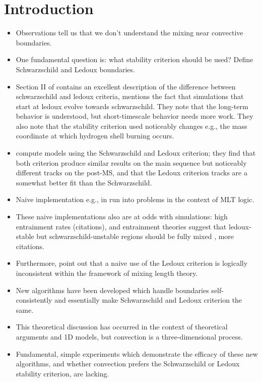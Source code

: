 
\section{Introduction}
\label{sec:introduction}

\begin{itemize}
    \item Observations tell us that we don't understand the mixing near convective boundaries.
    \item One fundamental question is: what stability criterion should be used? Define Schwarzschild and Ledoux boundaries.
    \item Section II of \citet{kaiser_etal_2020} contains an excellent description of the difference between schwarzschild and ledoux criteria, mentions the fact that simulations that start at ledoux evolve towards schwarzschild.
        They note that the long-term behavior is understood, but short-timescale behavior needs more work.
        They also note that the stability criterion used noticeably changes e.g., the mass coordinate at which hydrogen shell burning occurs.
    \item \citet{georgy_etal_2021} compute models using the Schwarzschild and Ledoux criterion; they find that both criterion produce similar results on the main sequence but noticeably different tracks on the post-MS, and that the Ledoux criterion tracks are a somewhat better fit than the Schwarzschild.    
    \item Naive implementation e.g., in \citet{mesa2} run into problems in the context of MLT logic.
    \item These naive implementations also are at odds with simulations: high entrainment rates (citations), and entrainment theories suggest that ledoux-stable but schwarzschild-unstable regions should be fully mixed \citep{fuentes_cumming_2020}, more citations.
    \item Furthermore, \citet{gabriel_etal_2014} point out that a naive use of the Ledoux criterion is logically inconsistent within the framework of mixing length theory.
    \item New algorithms \citep{mesa4, mesa5} have been developed which handle boundaries self-consistently and essentially make Schwarzschild and Ledoux criterion the same.
    \item This theoretical discussion has occurred in the context of theoretical arguments and 1D models, but convection is a three-dimensional process.
    \item Fundamental, simple experiments which demonstrate the efficacy of these new algorithms, and whether convection prefers the Schwarzschild or Ledoux stability criterion, are lacking.

\end{itemize}
